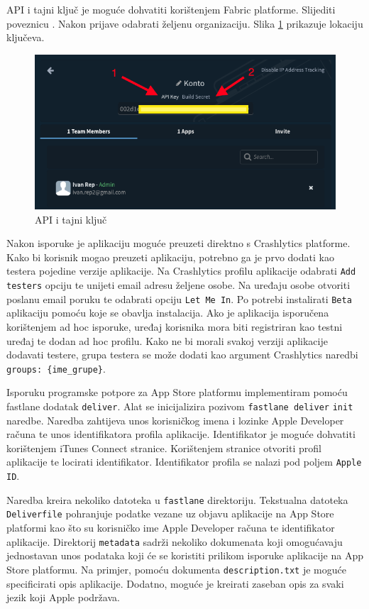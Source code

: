 \documentclass[times, utf8, diplomski, numeric]{fer}
\begin{document}
\begin{appendices}
API i tajni ključ je moguće dohvatiti korištenjem Fabric platforme. Slijediti poveznicu . Nakon prijave odabrati željenu organizaciju. Slika \ref{fig:FabricKeys} prikazuje lokaciju ključeva.

\begin{figure}
\centering
\includegraphics[scale=0.5]{FabricKeys}
\caption{API i tajni ključ}
\label{fig:FabricKeys}
\end{figure}

Nakon isporuke je aplikaciju moguće preuzeti direktno s Crashlytics platforme. Kako bi korisnik mogao preuzeti aplikaciju, potrebno ga je prvo dodati kao testera pojedine verzije aplikacije. Na Crashlytics profilu aplikacije odabrati \verb|Add testers| opciju te unijeti email adresu željene osobe. Na uređaju osobe otvoriti poslanu email poruku te odabrati opciju \verb|Let Me In|. Po potrebi instalirati \verb|Beta| aplikaciju pomoću koje se obavlja instalacija. Ako je aplikacija isporučena korištenjem ad hoc isporuke, uređaj korisnika mora biti registriran kao testni uređaj te dodan ad hoc profilu. Kako ne bi morali svakoj verziji aplikacije dodavati testere, grupa testera se može dodati kao argument Crashlytics naredbi \verb|groups: {ime_grupe}|.

Isporuku programske potpore za App Store platformu implementiram pomoću fastlane dodatak \verb|deliver|\citep{fastlane:deliver}. Alat se inicijalizira pozivom \verb|fastlane deliver| \verb|init| naredbe. Naredba zahtijeva unos korisničkog imena i lozinke Apple Developer računa te unos identifikatora profila aplikacije. Identifikator je moguće dohvatiti korištenjem iTunes Connect stranice. Korištenjem stranice otvoriti profil aplikacije te locirati identifikator. Identifikator profila se nalazi pod poljem \verb|Apple ID|.

Naredba kreira nekoliko datoteka u \verb|fastlane| direktoriju. Tekstualna datoteka \verb|Deliverfile| pohranjuje podatke vezane uz objavu aplikacije na App Store platformi kao što su korisničko ime Apple Developer računa te identifikator aplikacije. Direktorij \verb|metadata| sadrži nekoliko dokumenata koji omogućavaju jednostavan unos podataka koji će se koristiti prilikom isporuke aplikacije na App Store platformu. Na primjer, pomoću dokumenta \verb|description.txt| je moguće specificirati opis aplikacije. Dodatno, moguće je kreirati zaseban opis za svaki jezik koji Apple podržava.


\end{appendices}
\end{document}
